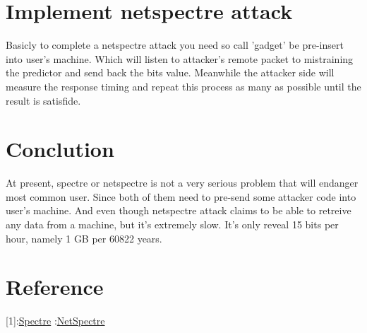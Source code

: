 \documentclass{article}
\begin{document}
\section{Implement netspectre attack}
Basicly to complete a netspectre attack you need so call 'gadget' be pre-insert into user's machine. Which will listen to attacker's remote packet to mistraining the predictor and send back the bits value. Meanwhile the attacker side will measure the response timing and repeat this process as many as possible until the result is satisfide.
\section{Conclution}
At present, spectre or netspectre is not a very serious problem that will endanger most common user. Since both of them need to pre-send some attacker code into user's machine. And even though netspectre attack claims to be able to retreive any data from a machine, but it's extremely slow. It's only reveal 15 bits per hour, namely 1 GB per 60822 years.
\section{Reference}
[1]:\href{https://spectreattack.com/spectre.pdf}{Spectre}
\newline
[2]:\href{https://arxiv.org/pdf/1807.10535.pdf}{NetSpectre}
\end{document}
